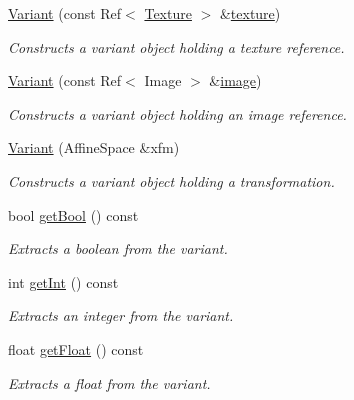 \begin{DoxyCompactItemize}
\hyperlink{structembree_1_1_variant_a67d9a1274d698ddbc2647bcba9b5926c}{Variant} (const Ref$<$ \hyperlink{classembree_1_1_texture}{Texture} $>$ \&\hyperlink{structembree_1_1_variant_a75c8a7960d7bd076d7944f459587083b}{texture})
\begin{DoxyCompactList}\small\item\em Constructs a variant object holding a texture reference. \item\end{DoxyCompactList}\item 
\hyperlink{structembree_1_1_variant_ab4ab1c18870af4aeb956c13f2a2c68bc}{Variant} (const Ref$<$ Image $>$ \&\hyperlink{structembree_1_1_variant_a2357d59f6f9492d26781a6a70a70d847}{image})
\begin{DoxyCompactList}\small\item\em Constructs a variant object holding an image reference. \item\end{DoxyCompactList}\item 
\hyperlink{structembree_1_1_variant_af7aa29bfcdf7882392c81d75b6082ba5}{Variant} (AffineSpace \&xfm)
\begin{DoxyCompactList}\small\item\em Constructs a variant object holding a transformation. \item\end{DoxyCompactList}\item 
bool \hyperlink{structembree_1_1_variant_a6d8dac33b0ab0b967371d9eac030855c}{getBool} () const 
\begin{DoxyCompactList}\small\item\em Extracts a boolean from the variant. \item\end{DoxyCompactList}\item 
int \hyperlink{structembree_1_1_variant_aa128898fc2e9f305782fd8cdf6f3df38}{getInt} () const 
\begin{DoxyCompactList}\small\item\em Extracts an integer from the variant. \item\end{DoxyCompactList}\item 
float \hyperlink{structembree_1_1_variant_a40bb51cd73081deaec10771885bd981b}{getFloat} () const 
\begin{DoxyCompactList}\small\item\em Extracts a float from the variant. \item\end{DoxyCompactList}\item 

\end{DoxyCompactItemize}
